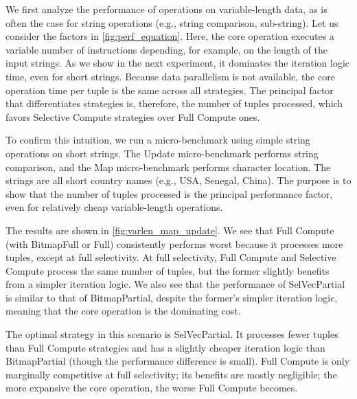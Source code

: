 \documentclass[12pt]{cmuthesis}
\begin{document}
We first analyze the performance of operations on variable-length data, as is often the case for string operations (e.g., string comparison, sub-string). Let us consider the factors in \cref{fig:perf_equation}. Here, the core operation executes a variable number of instructions depending, for example, on the length of the input strings. As we show in the next experiment, it dominates the iteration logic time, even for short strings. Because data parallelism is not available, the core operation time per tuple is the same across all strategies. The principal factor that differentiates strategies is, therefore, the number of tuples processed, which favors Selective Compute strategies over Full Compute ones.

To confirm this intuition, we run a micro-benchmark using simple string operations on short strings. The Update micro-benchmark performs string comparison, and the Map micro-benchmark performs character location. The strings are all short country names (e.g., USA, Senegal, China). The purpose is to show that the number of tuples processed is the principal performance factor, even for relatively cheap variable-length operations.

The results are shown in \cref{fig:varlen_map_update}. We see that Full Compute (with BitmapFull or Full) consistently performs worst because it processes more tuples, except at full selectivity. At full selectivity, Full Compute and Selective Compute process the same number of tuples, but the former slightly benefits from a simpler iteration logic. We also see that the performance of SelVecPartial is similar to that of BitmapPartial, despite the former's simpler iteration logic, meaning that the core operation is the dominating cost.

The optimal strategy in this scenario is SelVecPartial. It processes fewer tuples than Full Compute strategies and has a slightly cheaper iteration logic than BitmapPartial (though the performance difference is small). Full Compute is only marginally competitive at full selectivity; its benefits are mostly negligible; the more expansive the core operation, the worse Full Compute becomes. 
\end{document}
